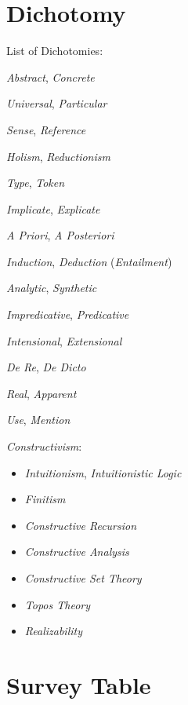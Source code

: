 \section{Dichotomy}\label{sec:dichotomy}

List of Dichotomies:

\emph{Abstract}, \emph{Concrete}

\emph{Universal}, \emph{Particular}

\emph{Sense}, \emph{Reference}

\emph{Holism}, \emph{Reductionism}

\emph{Type}, \emph{Token}

\emph{Implicate}, \emph{Explicate}

\emph{A Priori}, \emph{A Posteriori}

\emph{Induction}, \emph{Deduction} (\emph{Entailment})

\emph{Analytic}, \emph{Synthetic}

\emph{Impredicative}, \emph{Predicative}

\emph{Intensional}, \emph{Extensional}

\emph{De Re}, \emph{De Dicto}

\emph{Real}, \emph{Apparent}

\emph{Use}, \emph{Mention}

\emph{Constructivism}:
\begin{itemize}
    \item \emph{Intuitionism}, \emph{Intuitionistic Logic}
    \item \emph{Finitism}
    \item \emph{Constructive Recursion}
    \item \emph{Constructive Analysis}
    \item \emph{Constructive Set Theory}
    \item \emph{Topos Theory}
    \item \emph{Realizability}
\end{itemize}



\section{Survey Table}

